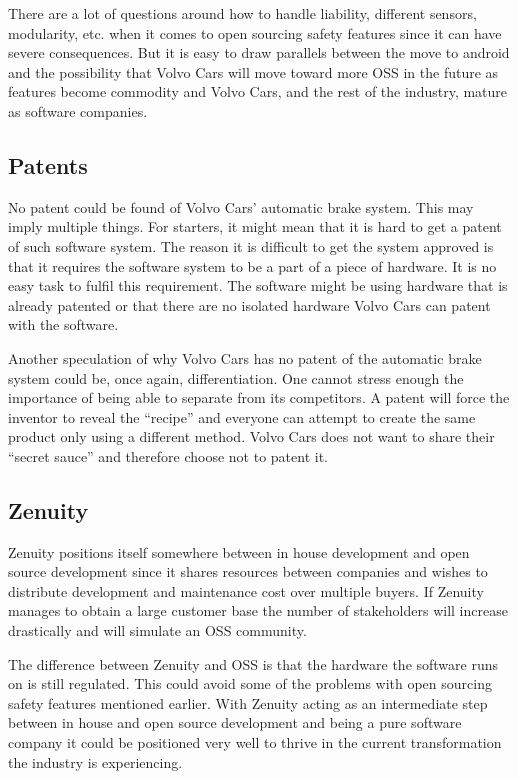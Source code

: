 \documentclass[conference]{IEEEtran}
\begin{document}
There are a lot of questions around how to handle liability, different sensors, modularity, etc. when it comes to open sourcing safety features since it can have severe consequences. But it is easy to draw parallels between the move to android and the possibility that Volvo Cars will move toward more OSS in the future as features become commodity and Volvo Cars, and the rest of the industry, mature as software companies.

\subsection{Patents}
No patent could be found of Volvo Cars' automatic brake system. This may imply multiple things. For starters, it might mean that it is hard to get a patent of such software system. The reason it is difficult to get the system approved is that it requires the software system to be a part of a piece of hardware. It is no easy task to fulfil this requirement. The software might be using hardware that is already patented or that there are no isolated hardware Volvo Cars can patent with the software. 

Another speculation of why Volvo Cars has no patent of the automatic brake system could be, once again, differentiation. One cannot stress enough the importance of being able to separate from its competitors. A patent will force the inventor to reveal the ``recipe'' and everyone can attempt to create the same product only using a different method. Volvo Cars does not want to share their ``secret sauce'' and therefore choose not to patent it. \cite{SoftwarePatent}

\subsection{Zenuity}
Zenuity positions itself somewhere between in house development and open source development since it shares resources between companies and wishes to distribute development and maintenance cost over multiple buyers. If Zenuity manages to obtain a large customer base the number of stakeholders will increase drastically and will simulate an OSS community.

The difference between Zenuity and OSS is that the hardware the software runs on is still regulated. This could avoid some of the problems with open sourcing safety features mentioned earlier. With Zenuity acting as an intermediate step between in house and open source development and being a pure software company it could be positioned very well to thrive in the current transformation the industry is experiencing.
\end{document}
